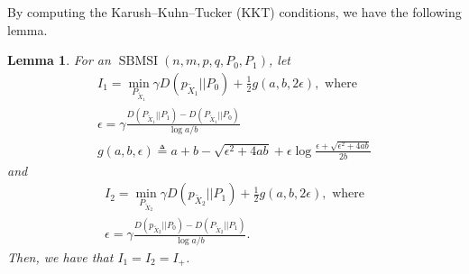 \documentclass[conference]{IEEEtran}
\newtheorem{lemma}{Lemma}
\DeclareMathOperator{\SBMSI}{SBMSI}
\begin{document}
	By computing the Karush–Kuhn–Tucker (KKT) conditions, we have the following lemma. %
	\begin{lemma}\label{lem:p0p12}
		For an $\SBMSI(n,m,p,q,P_0,P_1)$, let
		\begin{align}
			I_1=\min_{P_{\widetilde{X}_1}} \gamma D(p_{\widetilde{X}_1}|| P_0)+ \frac{1}{2} g(a,b, 2\epsilon),\text{ where}\nonumber\\
			\epsilon = \gamma \frac{D(P_{\widetilde{X}_1} || P_1) - D(P_{\widetilde{X}_1} || P_0) }{\log a /b}\label{eq:I1}\\
	   g(a,b,\epsilon) \triangleq a + b - \sqrt{\epsilon^2 + 4ab} + \epsilon \log \frac{\epsilon + \sqrt{\epsilon^2 + 4ab}}{2b}\label{equation:g}
		\end{align}
		and
		\begin{align}
			I_2=\min_{P_{\widetilde{X}_2}} \gamma D(p_{\widetilde{X}_2}|| P_1)+ \frac{1}{2} g(a,b, 2\epsilon),\text{ where}\nonumber\\
			\epsilon = \gamma \frac{D(p_{\widetilde{X}_2} || P_0) - D(P_{\widetilde{X}_2} || P_1) }{\log a /b}.\label{eq:I2}
		\end{align}
 		Then, we have that $I_1=I_2=I_+$. 
	\end{lemma}
\end{document}
